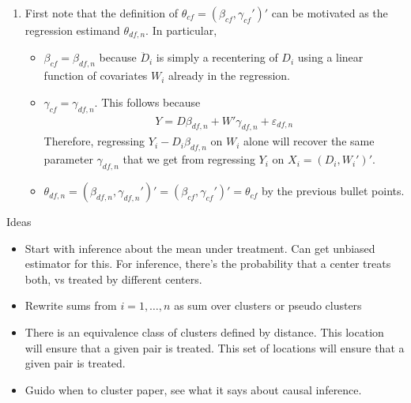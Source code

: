 \documentclass[12pt]{article}
\theoremstyle{plain}
\theoremstyle{definition}
\theoremstyle{remark}
\begin{document}
\begin{enumerate}
  \item
    First note that the definition of
    $\theta_{cf}=(\beta_{cf},\gamma_{cf}')'$ can be motivated as
    the regression estimand $\theta_{df,n}$.
    In particular,
    \begin{itemize}
      \item ${\beta}_{cf}=\beta_{df,n}$
        because $\ddot{D}_i$ is simply a recentering of $D_i$ using
        a linear function of covariates $W_i$ already in the regression.
      \item $\gamma_{cf}=\gamma_{df,n}$.
        This follows because
        \begin{align*}
          Y = D\beta_{df,n}+W'\gamma_{df,n} + \varepsilon_{df,n}
        \end{align*}
        Therefore, regressing $Y_i-D_i\beta_{df,n}$ on $W_i$ alone will
        recover the same parameter $\gamma_{df,n}$ that we get from
        regressing $Y_i$ on $X_i=(D_i,W_i')'$.
      \item
        $\theta_{df,n}=(\beta_{df,n},\gamma_{df,n}')'=(\beta_{cf},\gamma_{cf}')'=\theta_{cf}$
        by the previous bullet points.
    \end{itemize}


\end{enumerate}






\clearpage
Ideas
\begin{itemize}
  \item Start with inference about the mean under treatment.
    Can get unbiased estimator for this.
    For inference, there's the probability that a center treats both, vs
    treated by different centers.

  \item Rewrite sums from $i=1,\ldots,n$ as sum over clusters or pseudo
    clusters
  \item There is an equivalence class of clusters defined by distance.
    This location will ensure that a given pair is treated.
    This set of locations will ensure that a given pair is treated.
  \item Guido when to cluster paper, see what it says about causal
    inference.
\end{itemize}




\end{document}
